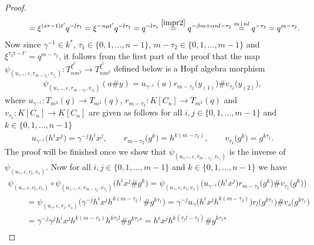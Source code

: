 \documentclass[11pt]{article}
\numberwithin{equation}{section}
\begin{document}
\begin{proof}
\begin{gather*}
\hphantom{\xi^{\tau_{1} t - t'}}{} = \xi^{(s\tau -1)t'} q^{-l\tau_{1}}= \xi^{-n \mu t'} q^{-l\tau_{1}} = q^{-l\tau_{1}} \stackrel{\eqref{impr2}} {=} q^{-\beta m + \alpha nl - \tau_{2}} \stackrel{m \,|\, nl} {=} q^{- \tau_{2}} = q^{m - \tau_{2}}.
\end{gather*}
Now since $\gamma^{-1} \in k^{*}$, $\tau_{1} \in \{0, 1,\dots, n-1\}$, $m - \tau_{2} \in \{0, 1,\dots, m-1\}$ and $\xi^{\tau_{1} t - t'} = q^{m-\tau_{2}}$, it follows from the first part of the proof that the map $\psi_{(u_{\gamma^{-1}}, \varepsilon, r_{m-\tau_{2}}, v_{\tau_{1}})}\colon T_{nm^{2}}^ {\xi^{t'}} \to T_{nm^{2}}^ {\xi^{t}}$ defined below is a Hopf algebra morphism
\begin{gather*}
\psi_{(u_{\gamma^{-1}}, \varepsilon, r_{m-\tau_{2}}, v_{\tau_{1}})}(a \# y) = u_{\gamma^{-1}}(a) r_{m-\tau_{2}}\big(y_{(1)}\big) \# v_{\tau_{1}}\big(y_{(2)}\big),
\end{gather*}
where $u_{\gamma^{-1}}\colon T_{m^{2}}(q) \to T_{m^{2}}(q)$, $r_{m-\tau_{2}}\colon K[C_{n}] \to T_{m^{2}}(q)$ and $v_{\tau_{1}}\colon K[C_{n}] \to K[C_{n}]$ are given as follows for all $i, j \in \{0, 1,\dots, m-1\}$ and $k \in \{0, 1,\dots, n-1\}$
\begin{gather*}
u_{\gamma^{-1}}\big(h^{i}x^{j}\big) = \gamma^{-j} h^{i}x^{j}, \qquad r_{m-\tau_{2}}\big(g^{k}\big) = h^{k(m-\tau_{2})}, \qquad v_{\tau_{1}}\big(g^{k}\big) = g^{k \tau_{1}}.
\end{gather*}
The proof will be finished once we show that $\psi_{(u_{\gamma^{-1}}, \varepsilon, r_{m-\tau_{2}}, v_{\tau_{1}})}$ is the
inverse of $\psi_{(u_{\gamma}, \varepsilon, r_{l}, v_{s})}$. Now for
all $i, j \in \{0, 1,\dots, m-1\}$ and $k \in \{0, 1,\dots, n-1\}$ we have
\begin{gather*}
\psi_{(u_{\gamma}, \varepsilon, r_{l}, v_{s})} \circ \psi_{(u_{\gamma^{-1}}, \varepsilon, r_{m-\tau_{2}}, v_{\tau_{1}})}\big(h^{i}x^{j} \# g^{k}\big) = \psi_{(u_{\gamma}, \varepsilon, r_{l}, v_{s})} \big(u_{\gamma^{-1}}\big(h^{i}x^{j}\big)r_{m-\tau_{2}}\big(g^{k}\big) \# v_{\tau_{1}}\big(g^{k}\big)\big) \\
\qquad \ {} = \psi_{(u_{\gamma}, \varepsilon, r_{l}, v_{s})} \big(\gamma^{-j} h^{i}x^{j}h^{k (m-\tau_{2})} \# g^{k \tau_{1}}\big)
 = \gamma^{-j} u_{\gamma}\big(h^{i}x^{j}h^{k (m-\tau_{2})}\big) r_{l}\big(g^{k \tau_{1}}\big) \# v_{s}\big(g^{k \tau_{1}}\big) \\
 \qquad \ {} = \gamma^{-j} \gamma^{j} h^{i}x^{j} h^{k (m-\tau_{2})} h^{k \tau_{1} l} \# g^{k \tau_{1} s}
 = h^{i}x^{j} h^{k (\underline{\tau_{1}} l -\underline{ \tau_{2}})} \# g^{k \underline{\tau_{1}} s} \\

\end{gather*}
\end{proof}
\end{document}
